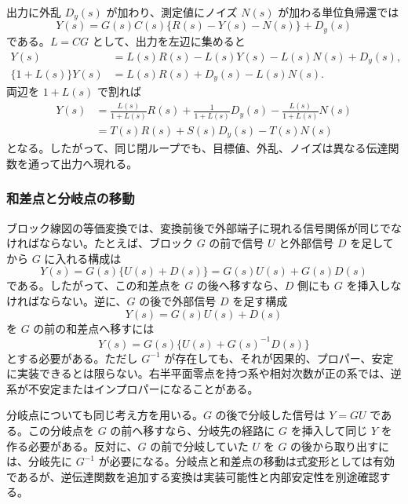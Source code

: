 出力に外乱 $D_y(s)$ が加わり、測定値にノイズ $N(s)$ が加わる単位負帰還では
\begin{equation}
  Y(s)=G(s)C(s)\{R(s)-Y(s)-N(s)\}+D_y(s)
\end{equation}
である。$L=CG$ として、出力を左辺に集めると
\begin{align}
  Y(s)&=L(s)R(s)-L(s)Y(s)-L(s)N(s)+D_y(s),\\
  \{1+L(s)\}Y(s)&=L(s)R(s)+D_y(s)-L(s)N(s).
\end{align}
両辺を $1+L(s)$ で割れば
\begin{align}
  Y(s)
  &=
  \frac{L(s)}{1+L(s)}R(s)
  +\frac{1}{1+L(s)}D_y(s)
  -\frac{L(s)}{1+L(s)}N(s)\\
  &=
  T(s)R(s)+S(s)D_y(s)-T(s)N(s)
  \label{eq:sensitivity-paths}
\end{align}
となる。したがって、同じ閉ループでも、目標値、外乱、ノイズは異なる伝達関数を通って出力へ現れる。

\subsubsection{和差点と分岐点の移動}

ブロック線図の等価変換では、変換前後で外部端子に現れる信号関係が同じでなければならない。たとえば、ブロック $G$ の前で信号 $U$ と外部信号 $D$ を足してから $G$ に入れる構成は
\begin{equation}
  Y(s)=G(s)\{U(s)+D(s)\}
  =G(s)U(s)+G(s)D(s)
  \label{eq:move-sum-before}
\end{equation}
である。したがって、この和差点を $G$ の後へ移すなら、$D$ 側にも $G$ を挿入しなければならない。逆に、$G$ の後で外部信号 $D$ を足す構成
\begin{equation}
  Y(s)=G(s)U(s)+D(s)
  \label{eq:move-sum-after}
\end{equation}
を $G$ の前の和差点へ移すには
\begin{equation}
  Y(s)=G(s)\{U(s)+G(s)^{-1}D(s)\}
\end{equation}
とする必要がある。ただし $G^{-1}$ が存在しても、それが因果的、プロパー、安定に実装できるとは限らない。右半平面零点を持つ系や相対次数が正の系では、逆系が不安定またはインプロパーになることがある。

分岐点についても同じ考え方を用いる。$G$ の後で分岐した信号は $Y=GU$ である。この分岐点を $G$ の前へ移すなら、分岐先の経路に $G$ を挿入して同じ $Y$ を作る必要がある。反対に、$G$ の前で分岐していた $U$ を $G$ の後から取り出すには、分岐先に $G^{-1}$ が必要になる。分岐点と和差点の移動は式変形としては有効であるが、逆伝達関数を追加する変換は実装可能性と内部安定性を別途確認する。

